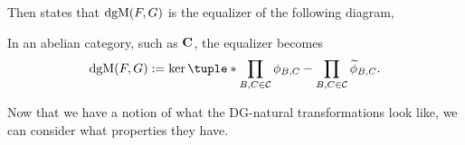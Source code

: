 \begin{remark}
    Then \cite[Proposition 6.3.1]{Borceux_1994} states that \( \operatorname{dgM}(F, G) \) is the equalizer of the following diagram,
    \begin{center}
    \end{center}

    In an abelian category, such as \( \operatorname{\mathbf{C}} \), the equalizer becomes
    \[
        \dgM(F, G) := \ker \tuple*{\prod\limits_{B, C \in \Cc} \phi_{B, C} - \prod\limits_{B, C \in \Cc} \widetilde{\phi}_{B, C}}.
    \]
\end{remark}

Now that we have a notion of what the DG-natural transformations look like, we can consider what properties they have.

